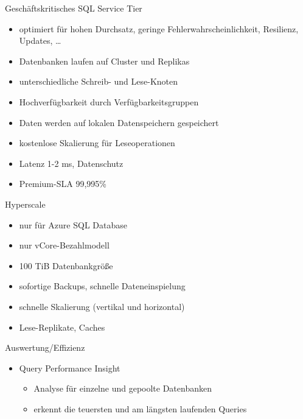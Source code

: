 \begin{flashcard}[Definition]{Geschäftskritisches SQL Service Tier}
  \begin{itemize}
    \item optimiert für hohen Durchsatz, geringe Fehlerwahrscheinlichkeit, Resilienz, Updates, \ldots
    \item Datenbanken laufen auf Cluster und Replikas
    \item unterschiedliche Schreib- und Lese-Knoten
    \item Hochverfügbarkeit durch Verfügbarkeitsgruppen
    \item Daten werden auf lokalen Datenspeichern gespeichert
    \item kostenlose Skalierung für Leseoperationen
    \item Latenz 1-2 ms, Datenschutz
    \item Premium-SLA 99,995\%
  \end{itemize}
\end{flashcard}

\begin{flashcard}[Definition]{Hyperscale}
  \begin{itemize}
    \item nur für Azure SQL Database
    \item nur vCore-Bezahlmodell
    \item 100 TiB Datenbankgröße
    \item sofortige Backups, schnelle Dateneinspielung
    \item schnelle Skalierung (vertikal und horizontal)
    \item Lese-Replikate, Caches
  \end{itemize}
\end{flashcard}

\begin{flashcard}[Definition]{Auswertung/Effizienz}
  \begin{itemize}
    \item Query Performance Insight
    \begin{itemize}
      \item Analyse für einzelne und gepoolte Datenbanken
      \item erkennt die teuersten und am längsten laufenden Queries
    \end{itemize}
  \end{itemize}
\end{flashcard}


